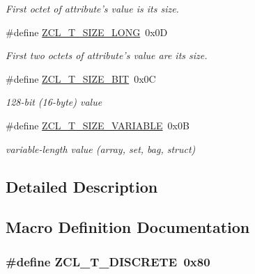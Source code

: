 \begin{DoxyCompactItemize}
\begin{DoxyCompactList}\small\item\em First octet of attribute's value is its size. \end{DoxyCompactList}\item 
\hypertarget{group__zcl__types_gaeee15697985458060bf5f85c00c15a41}{\#define \hyperlink{group__zcl__types_gaeee15697985458060bf5f85c00c15a41}{Z\-C\-L\-\_\-\-T\-\_\-\-S\-I\-Z\-E\-\_\-\-L\-O\-N\-G}~0x0\-D}\label{group__zcl__types_gaeee15697985458060bf5f85c00c15a41}

\begin{DoxyCompactList}\small\item\em First two octets of attribute's value are its size. \end{DoxyCompactList}\item 
\hypertarget{group__zcl__types_gad7a8d44d98b6872f187b1e0748ec7417}{\#define \hyperlink{group__zcl__types_gad7a8d44d98b6872f187b1e0748ec7417}{Z\-C\-L\-\_\-\-T\-\_\-\-S\-I\-Z\-E\-\_\-B\-I\-T}~0x0\-C}\label{group__zcl__types_gad7a8d44d98b6872f187b1e0748ec7417}

\begin{DoxyCompactList}\small\item\em 128-\/bit (16-\/byte) value \end{DoxyCompactList}\item 
\hypertarget{group__zcl__types_ga7691965c8c435fdafe30025c05817cf9}{\#define \hyperlink{group__zcl__types_ga7691965c8c435fdafe30025c05817cf9}{Z\-C\-L\-\_\-\-T\-\_\-\-S\-I\-Z\-E\-\_\-\-V\-A\-R\-I\-A\-B\-L\-E}~0x0\-B}\label{group__zcl__types_ga7691965c8c435fdafe30025c05817cf9}

\begin{DoxyCompactList}\small\item\em variable-\/length value (array, set, bag, struct) \end{DoxyCompactList}\end{DoxyCompactItemize}


\subsection{Detailed Description}


\subsection{Macro Definition Documentation}
\hypertarget{group__zcl__types_ga3e9bf95af4f58a0c9c5c34639b0dda29}{
\subsubsection[{Z\-C\-L\-\_\-\-T\-\_\-\-D\-I\-S\-C\-R\-E\-T\-E}]{\setlength{\rightskip}{0pt plus 5cm}\#define Z\-C\-L\-\_\-\-T\-\_\-\-D\-I\-S\-C\-R\-E\-T\-E~0x80}}\label{group__zcl__types_ga3e9bf95af4f58a0c9c5c34639b0dda29}


